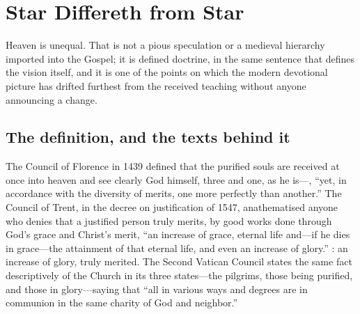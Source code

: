 \section{Star Differeth from Star}

Heaven is unequal. That is not a pious speculation or a medieval hierarchy imported into the Gospel; it is defined doctrine, in the same sentence that defines the vision itself, and it is one of the points on which the modern devotional picture has drifted furthest from the received teaching without anyone announcing a change.

\subsection{The definition, and the texts behind it}

The Council of Florence in 1439 defined that the purified souls are received at once into heaven and see clearly God himself, three and one, as he is---, ``yet, in accordance with the diversity of merits, one more perfectly than another.'' The Council of Trent, in the decree on justification of 1547, anathematised anyone who denies that a justified person truly merits, by good works done through God's grace and Christ's merit, ``an increase of grace, eternal life and---if he dies in grace---the attainment of that eternal life, and even an increase of glory.'' : an increase of glory, truly merited. The Second Vatican Council states the same fact descriptively of the Church in its three states---the pilgrims, those being purified, and those in glory---saying that ``all in various ways and degrees are in communion in the same charity of God and neighbor.''

